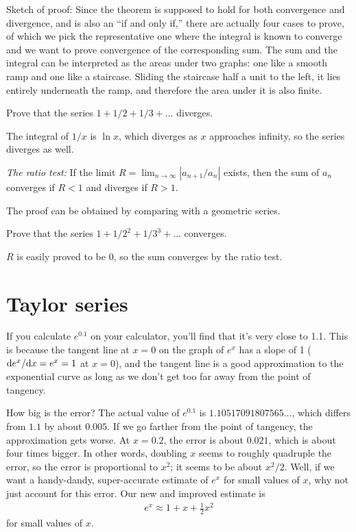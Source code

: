 Sketch of proof: Since the theorem is supposed to hold for both convergence and divergence, and is also an ``if and only if,''
there are actually four cases to prove, of which we pick the representative one where the integral is known to converge and we
want to prove convergence of the corresponding sum.
The sum and the integral can be interpreted as the areas under two graphs: one like a smooth ramp and one like a staircase.
Sliding the staircase half a unit to the left, it lies entirely underneath the ramp, and therefore the area under it is
also finite.

\begin{eg}
\egquestion Prove that the series $1+1/2+1/3+\ldots$ diverges.

\eganswer The integral of $1/x$ is $\ln x$, which diverges as $x$ approaches infinity, so the series diverges as well.
\end{eg}

\emph{The ratio test\/:} If the limit $R=\lim_{n\rightarrow\infty}|a_{n+1}/a_n|$ exists,
then the sum of $a_n$ converges if $R<1$ and diverges if $R>1$.

The proof can be obtained by comparing with a geometric series.

\begin{eg}
\egquestion Prove that the series $1+1/2^2+1/3^3+\ldots$ converges.

\eganswer $R$ is easily proved to be 0, so the sum converges by the ratio test.
\end{eg}

\section{Taylor series}\label{sec:taylor}

If you calculate $e^{0.1}$ on your calculator, you'll find that
it's very close to 1.1. This is because the tangent line at $x=0$
on the graph of $e^x$ has a slope of 1 ($\textup{d} e^x/\textup{d} x=e^x=1$ at $x=0$),
and the tangent line is a good approximation to the exponential curve
as long as we don't get too far away from the point of tangency.


How big is the error? The actual value of $e^{0.1}$ is $1.10517091807565\ldots$, which
differs from $1.1$ by about $0.005$. If we go farther from the point of tangency,
the approximation gets worse. At $x=0.2$, the error is about $0.021$, which is about
four times bigger. In other words, doubling $x$ seems to roughly quadruple the error,
so the error is proportional to $x^2$; it seems to be about $x^2/2$. Well, if we want a handy-dandy, super-accurate
estimate of $e^x$ for small values of $x$, why not just account for this
error. Our new and improved estimate is
\begin{align*}
  e^x \approx 1+x+\frac{1}{2}x^2
\end{align*}
for small values of $x$.

